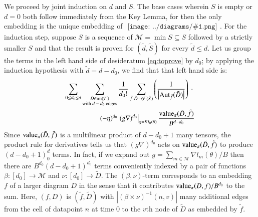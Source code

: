 \documentclass{article}
\newcommand{\Free}{\mathcal{F}}
\newcommand{\Aut}{\text{\textnormal{Aut}}}
\newcommand{\image}{\text{\textnormal{im}}}
\newcommand{\dvalue}{\text{\textnormal{value}}}
\newcommand{\Mm}{\mathcal{M}}
\newcommand{\wrap}[1]{\left(#1\right)}
\newcommand{\wabs}[1]{\left|#1\right|}
\newcommand{\sdia}[1]{\begin{gathered}\texttt{[image: ../diagrams/\#1.png]}\end{gathered}}
\begin{document}
            We proceed by joint induction on $d$ and $S$.  The base cases
            wherein $S$ is empty or $d=0$ both follow immediately from the Key
            Lemma, for then the only embedding is the unique embedding of
            $\sdia{(0)()}$.  For the induction step, suppose $S$ is a sequence
            of $\Mm = \min S \subseteq S$ followed by a strictly smaller $S$
            and that the result is proven for $(\tilde d, \tilde S)$ for every
            $\tilde d \leq d$.  Let us group the terms in the left hand side of
            desideratum \ref{eq:toprove} by $d_0$; by applying the induction
            hypothesis with $\tilde d = d - d_0$, we find that that left hand
            side is:
            \begin{align*}
                \sum_{\substack{
                    0 \leq d_0 \leq d
                }}
                \sum_{\substack{
                    \tilde D \in \image(\Free) \\
                    \textnormal{with $d-d_0$ edges}
                }}
                \frac{1}{d_0!}
                \sum_{\tilde f: \tilde D\to\Free(\tilde S)} \wrap{
                    \frac{1}{\wabs{\Aut_{\tilde f}(\tilde D)}}
                }
                ~\cdot~
                \\ %
                (-\eta)^{d_0}
                \left.
                    (g \nabla)^{d_0}
                \right|_{g=\nabla l_0(\theta)}
                \frac{\dvalue_\pi(\tilde D, \tilde f)}{B^{d-d_0}}
            \end{align*}
            Since $\dvalue_\pi(\tilde D, \tilde f)$ is a multilinear product of
            $d-d_0+1$ many tensors, the product rule for derivatives tells us
            that $(g \nabla)^{d_0}$ acts on $\dvalue_\pi(\tilde D, \tilde f)$
            to produce $(d-d_0+1)^d_0$ terms.  In fact, if we expand out
            $
                g = \sum_{m\in \Mm} \nabla l_m(\theta) / B
            $ 
            then there are $B^{d_0}(d-d_0+1)^{d_0}$ terms conveniently indexed
            by a pair of functions $\beta:[d_0]\to \Mm$ and $\nu:[d_0]\to
            \tilde D$.  The $(\beta, \nu)$-term corresponds to an embedding
            $f$ of a larger diagram $D$ in the sense that it contributes
            $\dvalue_\pi(D, f)/B^{d_0}$ to the sum.  Here, $(f, D)$ is $(\tilde
            f, \tilde D)$ with $\wabs{\wrap{\beta \times \nu}^{-1}(n, v)}$ many
            additional edges from the cell of datapoint $n$ at time $0$ to the
            $v$th node of $\tilde D$ as embedded by $\tilde f$.
\end{document}
